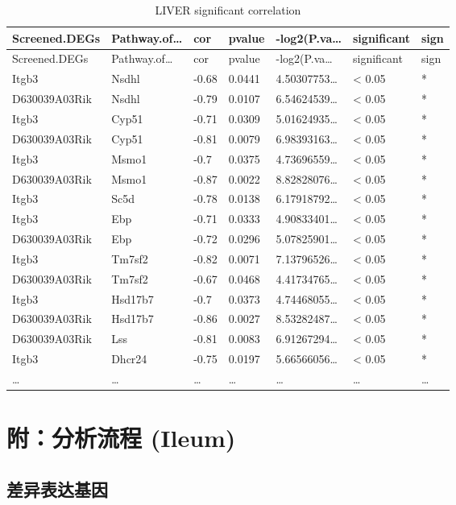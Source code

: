 \documentclass[
]{article}
\begin{document}
\begin{longtable}[]{@{}lllllll@{}}
\caption{\label{tab:LIVER-significant-correlation}LIVER significant correlation}\tabularnewline
\toprule
Screened.DEGs & Pathway.of\ldots{} & cor & pvalue & -log2(P.va\ldots{} & significant & sign\tabularnewline
\midrule
\endfirsthead
\toprule
Screened.DEGs & Pathway.of\ldots{} & cor & pvalue & -log2(P.va\ldots{} & significant & sign\tabularnewline
\midrule
\endhead
Itgb3 & Nsdhl & -0.68 & 0.0441 & 4.50307753\ldots{} & \textless{} 0.05 & *\tabularnewline
D630039A03Rik & Nsdhl & -0.79 & 0.0107 & 6.54624539\ldots{} & \textless{} 0.05 & *\tabularnewline
Itgb3 & Cyp51 & -0.71 & 0.0309 & 5.01624935\ldots{} & \textless{} 0.05 & *\tabularnewline
D630039A03Rik & Cyp51 & -0.81 & 0.0079 & 6.98393163\ldots{} & \textless{} 0.05 & *\tabularnewline
Itgb3 & Msmo1 & -0.7 & 0.0375 & 4.73696559\ldots{} & \textless{} 0.05 & *\tabularnewline
D630039A03Rik & Msmo1 & -0.87 & 0.0022 & 8.82828076\ldots{} & \textless{} 0.05 & *\tabularnewline
Itgb3 & Sc5d & -0.78 & 0.0138 & 6.17918792\ldots{} & \textless{} 0.05 & *\tabularnewline
Itgb3 & Ebp & -0.71 & 0.0333 & 4.90833401\ldots{} & \textless{} 0.05 & *\tabularnewline
D630039A03Rik & Ebp & -0.72 & 0.0296 & 5.07825901\ldots{} & \textless{} 0.05 & *\tabularnewline
Itgb3 & Tm7sf2 & -0.82 & 0.0071 & 7.13796526\ldots{} & \textless{} 0.05 & *\tabularnewline
D630039A03Rik & Tm7sf2 & -0.67 & 0.0468 & 4.41734765\ldots{} & \textless{} 0.05 & *\tabularnewline
Itgb3 & Hsd17b7 & -0.7 & 0.0373 & 4.74468055\ldots{} & \textless{} 0.05 & *\tabularnewline
D630039A03Rik & Hsd17b7 & -0.86 & 0.0027 & 8.53282487\ldots{} & \textless{} 0.05 & *\tabularnewline
D630039A03Rik & Lss & -0.81 & 0.0083 & 6.91267294\ldots{} & \textless{} 0.05 & *\tabularnewline
Itgb3 & Dhcr24 & -0.75 & 0.0197 & 5.66566056\ldots{} & \textless{} 0.05 & *\tabularnewline
\ldots{} & \ldots{} & \ldots{} & \ldots{} & \ldots{} & \ldots{} & \ldots{}\tabularnewline
\bottomrule
\end{longtable}

\hypertarget{workflow2}{%
\section{附：分析流程 (Ileum)}\label{workflow2}}

\hypertarget{ux5deeux5f02ux8868ux8fbeux57faux56e0-1}{%
\subsection{差异表达基因}\label{ux5deeux5f02ux8868ux8fbeux57faux56e0-1}}
\end{document}

